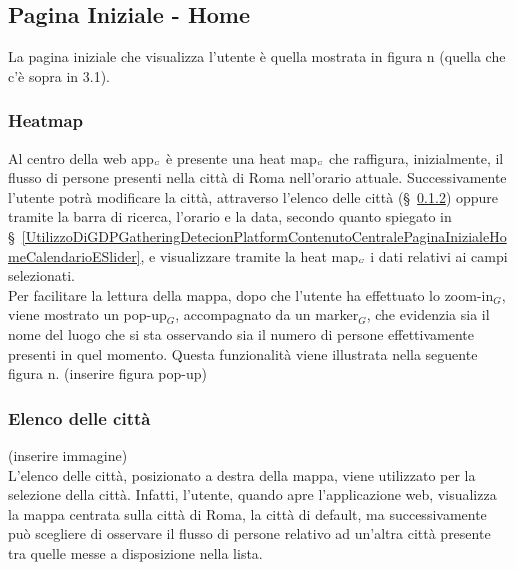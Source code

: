\subsection{Pagina Iniziale - Home} \label{UtilizzoDiGDPGatheringDetecionPlatformContenutoCentralePaginaInizialeHome}
La pagina iniziale che visualizza l'utente è quella mostrata in figura n (quella che c'è sopra in 3.1). 
\subsubsection{Heatmap}\label{UtilizzoDiGDPGatheringDetecionPlatformContenutoCentralePaginaInizialeHomeHeatmap}
Al centro della web app$_{\scaleto{G}{3pt}}$ è presente una heat map$_{\scaleto{G}{3pt}}$ che raffigura, inizialmente, il flusso di persone presenti nella città di Roma nell'orario attuale. Successivamente l'utente potrà modificare la città, attraverso l'elenco delle città (\S~\ref{UtilizzoDiGDPGatheringDetecionPlatformContenutoCentralePaginaInizialeHomeMenùATendina}) oppure tramite la barra di ricerca, l'orario e la data, secondo quanto spiegato in \S~\ref{UtilizzoDiGDPGatheringDetecionPlatformContenutoCentralePaginaInizialeHomeCalendarioESlider}, e visualizzare tramite la heat map$_{\scaleto{G}{3pt}}$ i dati relativi ai campi selezionati.\\
Per facilitare la lettura della mappa, dopo che l'utente ha effettuato lo zoom-in$_G$, viene mostrato un pop-up$_G$, accompagnato da un marker$_G$, che evidenzia sia il nome del luogo che si sta osservando sia il numero di persone effettivamente presenti in quel momento. Questa funzionalità viene illustrata nella seguente figura n. (inserire figura pop-up)
\subsubsection{Elenco delle città} \label{UtilizzoDiGDPGatheringDetecionPlatformContenutoCentralePaginaInizialeHomeMenùATendina}
(inserire immagine) \\
L'elenco delle città, posizionato a destra della mappa, viene utilizzato per la selezione della città. Infatti, l'utente, quando apre l'applicazione web, visualizza la mappa centrata sulla città di Roma, la città di default, ma successivamente può scegliere di osservare il flusso di persone relativo ad un'altra città presente tra quelle messe a disposizione nella lista. 

